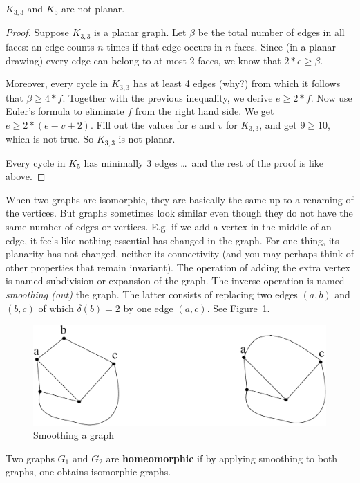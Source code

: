  \begin{theorem}
$K_{3,3}$ and $K_{5}$ are not planar.
\end{theorem}
\begin{proof}
Suppose $K_{3,3}$ is a planar graph. Let $\beta$ be the total number
of edges in all faces: an edge counts $n$ times if that edge occurs in
$n$ faces. Since (in a planar drawing) every edge can belong to at most 2
faces, we know that $2*e \geq \beta$.

Moreover, every cycle in $K_{3,3}$ has at least 4 edges (why?) from
which it follows that $\beta \geq 4*f$. Together with the previous
inequality, we derive $e \geq 2*f$. Now use Euler's formula to
eliminate $f$ from the right hand side. We get $e \geq 2*(e-v+2)$.
Fill out the values for $e$ and $v$ for $K_{3,3}$, and get $9 \geq
10$, which is not true. So $K_{3,3}$ is not planar.

Every cycle in $K_{5}$ has minimally 3 edges \ldots\ and the rest of
the proof is like above.
\end{proof}


When two graphs are isomorphic, they are basically the same up to a
renaming of the vertices. But graphs sometimes look similar even
though they do not have the same number of edges or
vertices. E.g. if we add a vertex in the middle of an edge, it feels
like nothing essential has changed in the graph. For one thing, its
planarity has not changed, neither its connectivity (and you may
perhaps think of other properties that remain invariant). The
operation of adding the extra vertex is named subdivision or expansion
of the graph. The inverse operation is named {\em smoothing (out)} the
graph. The latter consists of replacing two edges $(a,b)$ and $(b,c)$
of which $\delta(b) = 2$ by one edge $(a,c)$. See Figure~\ref{rij1}.



\begin{figure}[ht]
\begin{center}
\includegraphics[width=0.4\linewidth,keepaspectratio]{rij1}
\end{center}
\caption{Smoothing a graph \label{rij1}}
\end{figure}

\begin{definition}
  \textup{Two graphs $G_{1}$ and $G_{2}$ are \textbf{homeomorphic} if
by applying smoothing to both graphs, one obtains isomorphic graphs.}
\end{definition}

